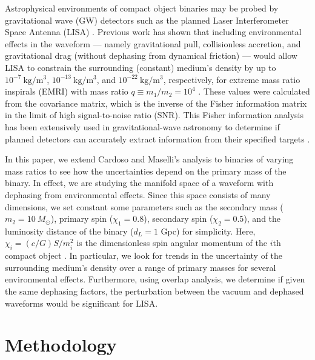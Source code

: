 \documentclass[10pt,a4paper,twoside]{article}
\begin{document}
Astrophysical environments of compact object binaries may be probed by gravitational wave (GW) detectors such as the planned Laser Interferometer Space Antenna (LISA) \cite{barausse2014}. Previous work has shown that including environmental effects in the waveform --- namely gravitational pull, collisionless accretion, and gravitational drag (without dephasing from dynamical friction) --- would allow LISA to constrain the surrounding (constant) medium's density by up to $10^{-7} ~\text{kg}/\text{m}^3$, $10^{-13} ~\text{kg}/\text{m}^3$, and $10^{-22} ~\text{kg}/\text{m}^3$, respectively, for extreme mass ratio inspirals (EMRI) with mass ratio $q \equiv m_1/m_2 = 10^4$ \cite{Cardoso2020}. These values were calculated from the covariance matrix, which is the inverse of the Fisher information matrix in the limit of high signal-to-noise ratio (SNR). This Fisher information analysis has been extensively used in gravitational-wave astronomy to determine if planned detectors can accurately extract information from their specified targets \cite{Vallisneri2008}. 

In this paper, we extend Cardoso and Maselli's analysis \cite{Cardoso2020} to binaries of varying mass ratios to see how the uncertainties depend on the primary mass of the binary. In effect, we are studying the manifold space of a waveform with dephasing from environmental effects. Since this space consists of many dimensions, we set constant some parameters such as the secondary mass ($m_2 = 10 ~M_{\odot}$), primary spin ($\chi_1 = 0.8$), secondary spin ($\chi_2 = 0.5$), and the luminosity distance of the binary ($d_L = 1$ Gpc) for simplicity. Here, $\chi_i = (c/G) S/m_i^2$ is the dimensionless spin angular momentum of the $i$th compact object \cite{ligo2017basic}. In particular, we look for trends in the uncertainty of the surrounding medium's density over a range of primary masses for several environmental effects. Furthermore, using overlap analysis, we determine if given the same dephasing factors, the perturbation between the vacuum and dephased waveforms would be significant for LISA. 


\section{Methodology}\label{sec:metho}
\end{document}
